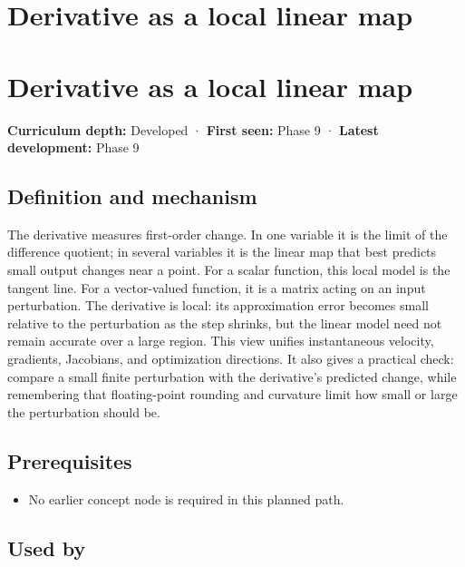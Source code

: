 \hypertarget{appendix-7bc181935c42}{}
\section*{Derivative as a local linear map}
\section{Derivative as a local linear map}\label{appendix-7bc181935c42-derivative-as-a-local-linear-map}

\textbf{Curriculum depth:} Developed · \textbf{First seen:} Phase 9 · \textbf{Latest development:} Phase 9

\subsection{Definition and mechanism}\label{appendix-7bc181935c42-definition-and-mechanism}

The derivative measures first-order change. In one variable it is the limit of the difference quotient; in several variables it is the linear map that best predicts small output changes near a point. For a scalar function, this local model is the tangent line. For a vector-valued function, it is a matrix acting on an input perturbation. The derivative is local: its approximation error becomes small relative to the perturbation as the step shrinks, but the linear model need not remain accurate over a large region. This view unifies instantaneous velocity, gradients, Jacobians, and optimization directions. It also gives a practical check: compare a small finite perturbation with the derivative's predicted change, while remembering that floating-point rounding and curvature limit how small or large the perturbation should be.

\subsection{Prerequisites}\label{appendix-7bc181935c42-prerequisites}

\begin{itemize}
\tightlist
\item
  No earlier concept node is required in this planned path.
\end{itemize}

\subsection{Used by}\label{appendix-7bc181935c42-used-by}


